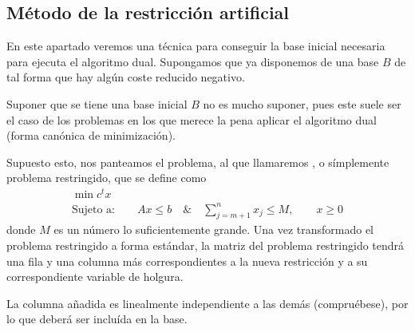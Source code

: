 \subsection{Método de la restricción artificial}
En este apartado veremos una técnica para conseguir la base inicial necesaria para ejecuta el algoritmo dual. Supongamos que ya disponemos de una base $B$ de tal forma que hay algún coste reducido negativo.
\begin{obs}[Suposiciones]
	Suponer que se tiene una base inicial $B$ no es mucho suponer, pues este suele ser el caso de los problemas en los que merece la pena aplicar el algoritmo dual (forma canónica de minimización).
\end{obs}
Supuesto esto, nos panteamos el problema, al que llamaremos , o símplemente problema restringido, que se define como
\begin{equation*}
\begin{array}{c}
\min c^tx\\
\text{Sujeto a:}\qquad Ax\leq b\quad \&\quad \sum_{j=m+1}^{n}x_j\leq M,\qquad x\geq 0
\end{array}
\end{equation*}
donde $M$ es un número lo suficientemente grande. Una vez transformado el problema restringido a forma estándar, la matriz del problema restringido tendrá una fila y una columna más correspondientes a la nueva restricción y a su correspondiente variable de holgura.

La columna añadida es linealmente independiente a las demás (compruébese), por lo que deberá ser incluída en la base.

